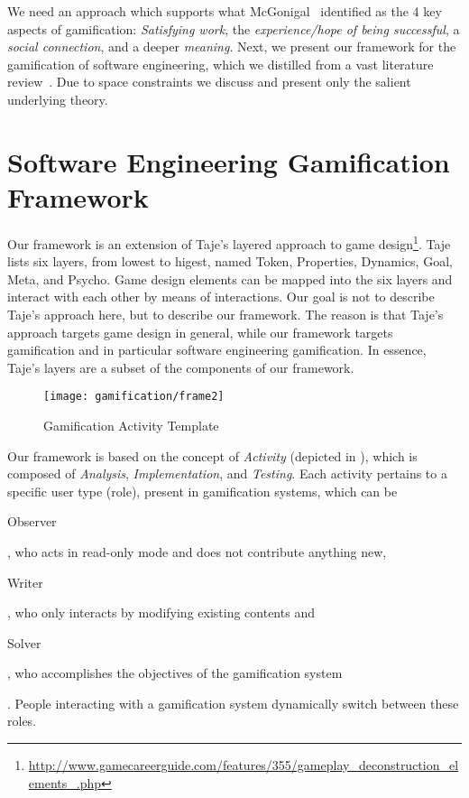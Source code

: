 We need an approach which supports what McGonigal~\cite{McGo2011a} identified as the 4 key aspects of gamification: {\em Satisfying work}, the {\em experience/hope of being successful}, a {\em social connection}, and a deeper {\em meaning}.
Next, we present our framework for the gamification of software engineering, which we distilled from a vast literature review~\cite{Mast2014a}.
Due to space constraints we discuss and present only the salient underlying theory.



\section{Software Engineering Gamification Framework}\label{sec:gamification-framework}

Our framework is an extension of Taje's layered approach to game design\footnote{\url{http://www.gamecareerguide.com/features/355/gameplay_deconstruction_elements_.php}}.
Taje lists six layers, from lowest to higest, named Token, Properties, Dynamics, Goal, Meta, and Psycho.
Game design elements can be mapped into the six layers and interact with each other by means of interactions.
Our goal is not to describe Taje's approach here, but to describe our framework.
The reason is that Taje's approach targets game design in general, while our framework targets gamification and in particular software engineering gamification.
In essence, Taje's layers are a subset of the components of our framework.

\begin{figure}[ht]
\centering
\texttt{[image: gamification/frame2]}
\caption{Gamification Activity Template}
\label{fig-frame}
\end{figure}

Our framework is based on the concept of {\em Activity} (depicted in ), which is composed of {\em Analysis}, {\em Implementation}, and {\em Testing}.
Each activity pertains to a specific user type (role), present in gamification systems, which can be \begin{inparaenum}[i)] {\em \item Observer}, who acts in read-only mode and does not contribute anything new, {\em \item Writer}, who only interacts by modifying existing contents and {\em \item Solver}, who accomplishes the objectives of the gamification system\end{inparaenum}.
People interacting with a gamification system dynamically switch between these roles.

